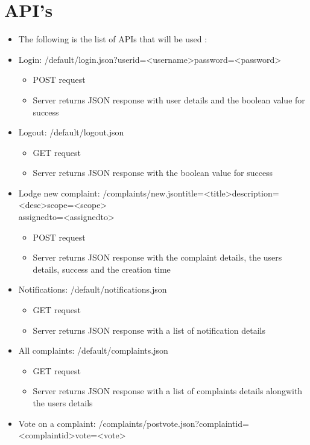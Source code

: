 \documentclass[12pt]{article}
\begin{document}
\section{API's}
\begin{itemize}
\item The following is the list of APIs that will be used :
\item Login: /default/login.json?userid=<username>password=<password>
	\begin{itemize}
		\color{blue}
		\item POST request
		\item Server returns JSON response with user details and the boolean value for success
	\end{itemize}
\item Logout: /default/logout.json
	\begin{itemize}
		\color{blue}
		\item GET request
		\item Server returns JSON response with the boolean value for success
	\end{itemize}
\item Lodge new complaint: /complaints/new.jsontitle=<title>description=<desc>scope=<scope>\\assignedto=<assignedto>
	\begin{itemize}
		\color{blue}
		\item POST request
		\item Server returns JSON response with the complaint details, the users details, success and the creation time
	\end{itemize}
\item Notifications: /default/notifications.json
	\begin{itemize}
		\color{blue}
		\item GET request
		\item Server returns JSON response with a list of notification details
	\end{itemize}
\item All complaints: /default/complaints.json
	\begin{itemize}
		\color{blue}
		\item GET request
		\item Server returns JSON response with a list of complaints details alongwith the users details
	\end{itemize}
\item Vote on a complaint: /complaints/postvote.json?complaintid=<complaintid>vote=<vote>

\end{itemize}
\end{document}
